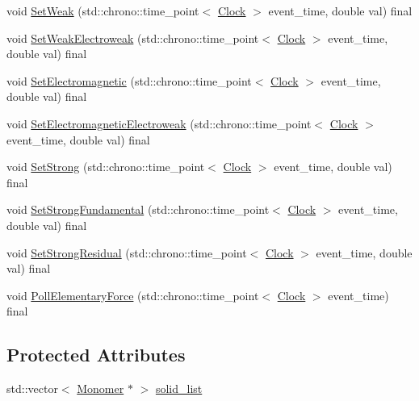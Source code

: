 \begin{DoxyCompactItemize}
\item 
void \mbox{\hyperlink{classMonomer_ad4fe1db33f493575281e1a2fb35004ca}{Set\+Weak}} (std\+::chrono\+::time\+\_\+point$<$ \mbox{\hyperlink{universe_8h_a0ef8d951d1ca5ab3cfaf7ab4c7a6fd80}{Clock}} $>$ event\+\_\+time, double val) final
\item 
void \mbox{\hyperlink{classMonomer_ab887d7cfd2ecb557efb3ace59852019c}{Set\+Weak\+Electroweak}} (std\+::chrono\+::time\+\_\+point$<$ \mbox{\hyperlink{universe_8h_a0ef8d951d1ca5ab3cfaf7ab4c7a6fd80}{Clock}} $>$ event\+\_\+time, double val) final
\item 
void \mbox{\hyperlink{classMonomer_a50e41be601b31450a97bfd15950cfb3d}{Set\+Electromagnetic}} (std\+::chrono\+::time\+\_\+point$<$ \mbox{\hyperlink{universe_8h_a0ef8d951d1ca5ab3cfaf7ab4c7a6fd80}{Clock}} $>$ event\+\_\+time, double val) final
\item 
void \mbox{\hyperlink{classMonomer_aa034728b74053ed3df452ddc8f1b46e8}{Set\+Electromagnetic\+Electroweak}} (std\+::chrono\+::time\+\_\+point$<$ \mbox{\hyperlink{universe_8h_a0ef8d951d1ca5ab3cfaf7ab4c7a6fd80}{Clock}} $>$ event\+\_\+time, double val) final
\item 
void \mbox{\hyperlink{classMonomer_a10b864f6bcad43f11a2316dbbe4c4742}{Set\+Strong}} (std\+::chrono\+::time\+\_\+point$<$ \mbox{\hyperlink{universe_8h_a0ef8d951d1ca5ab3cfaf7ab4c7a6fd80}{Clock}} $>$ event\+\_\+time, double val) final
\item 
void \mbox{\hyperlink{classMonomer_ad9df06c1a8264bfdb514ef3ba04ef4c7}{Set\+Strong\+Fundamental}} (std\+::chrono\+::time\+\_\+point$<$ \mbox{\hyperlink{universe_8h_a0ef8d951d1ca5ab3cfaf7ab4c7a6fd80}{Clock}} $>$ event\+\_\+time, double val) final
\item 
void \mbox{\hyperlink{classMonomer_ae6ca57913da27fa749d33d1c4fed27ca}{Set\+Strong\+Residual}} (std\+::chrono\+::time\+\_\+point$<$ \mbox{\hyperlink{universe_8h_a0ef8d951d1ca5ab3cfaf7ab4c7a6fd80}{Clock}} $>$ event\+\_\+time, double val) final
\item 
void \mbox{\hyperlink{classMonomer_a5b2375df1e19abdf6045c475d2ac23ca}{Poll\+Elementary\+Force}} (std\+::chrono\+::time\+\_\+point$<$ \mbox{\hyperlink{universe_8h_a0ef8d951d1ca5ab3cfaf7ab4c7a6fd80}{Clock}} $>$ event\+\_\+time) final
\end{DoxyCompactItemize}
\subsection*{Protected Attributes}
\begin{DoxyCompactItemize}
\item 
std\+::vector$<$ \mbox{\hyperlink{classMonomer}{Monomer}} $\ast$ $>$ \mbox{\hyperlink{classMonomer_ad792aeb859c72edbb17414bf00b8fd12}{solid\+\_\+list}}
\end{DoxyCompactItemize}
